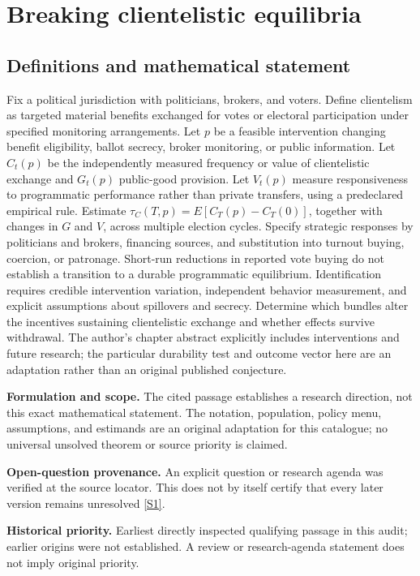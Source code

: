 \documentclass[11pt]{article}
\newcommand{\sref}[2]{\hyperlink{source:#1:#2}{[S#2]}}
\begin{document}
\section*{Breaking clientelistic equilibria}\label{30007666}
\subsection{Definitions and mathematical statement}
Fix a political jurisdiction with politicians, brokers, and voters. Define clientelism as targeted material benefits exchanged for votes or electoral participation under specified monitoring arrangements. Let \(p\) be a feasible intervention changing benefit eligibility, ballot secrecy, broker monitoring, or public information. Let \(C_t(p)\) be the independently measured frequency or value of clientelistic exchange and \(G_t(p)\) public-good provision. Let \(V_t(p)\) measure responsiveness to programmatic performance rather than private transfers, using a predeclared empirical rule. Estimate \(\tau_C(T,p)=E[C_T(p)-C_T(0)]\), together with changes in \(G\) and \(V\), across multiple election cycles. Specify strategic responses by politicians and brokers, financing sources, and substitution into turnout buying, coercion, or patronage. Short-run reductions in reported vote buying do not establish a transition to a durable programmatic equilibrium. Identification requires credible intervention variation, independent behavior measurement, and explicit assumptions about spillovers and secrecy. Determine which bundles alter the incentives sustaining clientelistic exchange and whether effects survive withdrawal. The author's chapter abstract explicitly includes interventions and future research; the particular durability test and outcome vector here are an adaptation rather than an original published conjecture.

\par\textbf{Formulation and scope.} The cited passage establishes a research direction, not this exact mathematical statement. The notation, population, policy menu, assumptions, and estimands are an original adaptation for this catalogue; no universal unsolved theorem or source priority is claimed.

\par\textbf{Open-question provenance.} An explicit question or research agenda was verified at the source locator. This does not by itself certify that every later version remains unresolved \sref{30007666}{1}.

\par\textbf{Historical priority.} Earliest directly inspected qualifying passage in this audit; earlier origins were not established. A review or research-agenda statement does not imply original priority.
\end{document}
